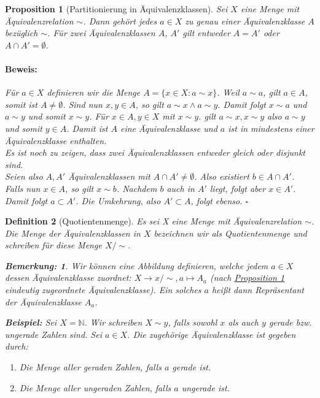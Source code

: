 \documentclass{report}
\newcommand{\IN}[1]{\index{#1|BH}}
\newcommand{\N}{\mathbb{N}}
\theoremstyle{customrem}
\newtheorem*{bem}{Bemerkung:}
\theoremstyle{customdef}
\newtheorem{definition}{Definition}[chapter]
\newtheorem{proposition}[definition]{Proposition}
\renewenvironment{proof}{\vspace{-.75cm}\paragraph{Beweis: }}{\vspace{-.5cm}\hfill$\square$}
\begin{document}
	\begin{proposition}[Partitionierung in Äquivalenzklassen]
		\label{prop122}
		Sei $X$ eine Menge mit Äquivalenzrelation $\sim$. Dann gehört jedes $a \in X$ zu genau einer Äquivalenzklasse $A$ bezüglich $\sim$. Für zwei Äquivalenzklassen $A$, $A'$ gilt entweder $A = A'$ oder $A\cap A' = \emptyset$.\\
		\begin{proof}
			Für $a \in X$ definieren wir die Menge $A = \{x \in X : a \sim x\}$.
			Weil $a \sim a$, gilt $a \in A$, somit ist $A \neq \emptyset$. 
			Sind nun $x, y \in A$, so gilt $a \sim x \land a \sim y$. Damit folgt $x \sim a$ und $a \sim y$ und somit $x \sim y$.
			Für $x \in A, y \in X$ mit $x \sim y$. gilt $a \sim x, x \sim y$ also $a \sim y$ und somit $y \in A$.
			Damit ist $A$ eine Äquivalenzklasse und $a$ ist in \textit{mindestens} einer Äquivalenzklasse enthalten.\\[.125cm]
			Es ist noch zu zeigen, dass zwei Äquivalenzklassen entweder gleich oder disjunkt sind.\\
			Seien also $A, A'$ Äquivalenzklassen mit $A \cap A' \neq \emptyset$. Also existiert $b \in A\cap A'$. Falls nun $x \in A$, so gilt $x \sim b$. Nachdem $b$ auch in $A'$ liegt, folgt aber $x \in A'$. Damit folgt $a \subset A'$. Die Umkehrung, also $A' \subset A$, folgt ebenso.
		\end{proof}
	\end{proposition}
	
	\vspace{.25cm}
	
	\begin{definition}[Quotientenmenge]
		\IN{Menge!Quotienten-}
		Es sei X eine Menge mit Äquivalenzrelation $\sim$. Die Menge der Äquivalenzklassen in $X$ bezeichnen wir  als Quotientenmenge und schreiben für diese Menge $X/{\sim}$.\\
		\begin{bem}
			Wir können eine Abbildung definieren, welche jedem $a \in X$ dessen Äquivalenzklasse zuordnet:
			$X \to x/{\sim}, a \mapsto A_a$ (nach \hyperref[prop122]{Proposition \ref{prop122}} eindeutig zugeordnete Äquivalenzklasse).
			Ein solches $a$ heißt dann Repräsentant der Äquivalenzklasse $A_a$.\\
		\end{bem}
		\noindent\textbf{Beispiel: }
		Sei $X = \N$. Wir schreiben $X \sim y$, falls sowohl $x$ als auch $y$ gerade bzw. ungerade Zahlen sind.
		Sei $a \in X$. Die zugehörige Äquivalenzklasse ist gegeben durch:
		\begin{enumerate}[leftmargin=3cm]
			\itemsep0cm
			\item Die Menge aller geraden Zahlen, falls $a$ gerade ist.
			\item Die Menge aller ungeraden Zahlen, falls $a$ ungerade ist.
		\end{enumerate}
	\end{definition}
\end{document}
